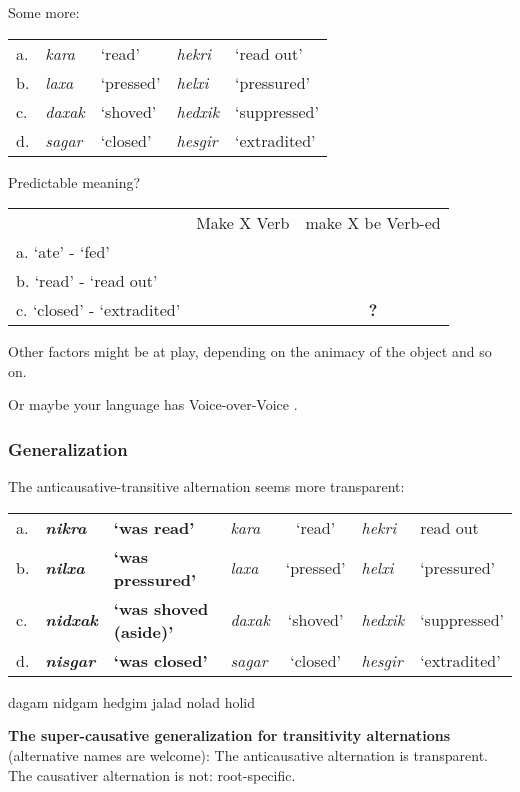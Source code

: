 \pex Some more:\\
		\begin{tabular}{lll@{ $\sim$ }ll}
		a.& \emph{kara} & `read'		& \emph{hekri}	& `read out'\\
		b.& \emph{laxa\texttslig} & `pressed'	& \emph{helxi\texttslig} & `pressured'\\
		c.&	\emph{daxak}	& `shoved'	& \emph{hedxik}	& `suppressed'\\
		d.& \emph{sagar} & `closed'		& \emph{hesgir} & `extradited'\\
		\end{tabular}
\xe

\pex Predictable meaning?\\
	\begin{tabular}{lcc}
		& Make X Verb	& make X be Verb-ed\\
	a. `ate' - `fed'	& \cmark & \xmark\\
	b. `read' - `read out' & \xmark & \cmark\\
	c. `closed' - `extradited' & \xmark	& \textbf{?}\\
	\end{tabular}
\xe
{} Other factors might be at play, depending on the animacy of the object and so on.
	
\ex Or maybe your language has Voice-over-Voice \citep{nie17}.
\xe

	\subsubsection{Generalization}
\pex The anticausative-transitive alternation seems more transparent:\\
		\begin{tabular}{lll@{ $\sim$ }lc@{ $\sim$ }ll}
		a.& \textbf{\emph{nikra}} & \textbf{`was read'} & \emph{kara} & `read'		& \emph{hekri}	& read out\\
		b. & \textbf{\emph{nilxa\texttslig}} & \textbf{`was pressured'} & \emph{laxa\texttslig} & `pressed'	& \emph{helxi\texttslig} & `pressured'\\
		c.&	\textbf{\emph{nidxak}} & \textbf{`was shoved (aside)'} & \emph{daxak}	& `shoved'	& \emph{hedxik}	& `suppressed'\\
		d.& \textbf{\emph{nisgar}} & \textbf{`was closed'} & \emph{sagar} & `closed'		& \emph{hesgir} & `extradited'\\
		\end{tabular}
\xe
dagam nidgam hedgim
jalad nolad holid

\pex \textbf{The super-causative generalization for transitivity alternations}\\
	(alternative names are welcome):
	\a The anticausative alternation is transparent.
	\a The causativer alternation is not: root-specific.
\xe

